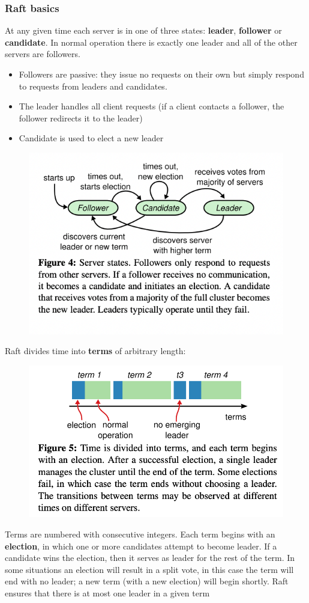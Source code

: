 \documentclass[11pt]{article}
\begin{document}
\subsubsection{Raft basics}
\label{sec:org8457912}
At any given time each server is in one of three states: \textbf{leader}, \textbf{follower} or \textbf{candidate}. In
normal operation there is exactly one leader and all of the other servers are followers.
\begin{itemize}
\item Followers are passive: they issue no requests on their own but simply respond to requests from
leaders and candidates.
\item The leader handles all client requests (if a client contacts a follower, the follower
redirects it to the leader)
\item Candidate is used to elect a new leader
\end{itemize}
\begin{figure}[htbp]
\centering
\includegraphics[width=.7\textwidth]{../images/6.824/4.png}
\label{}
\end{figure}

Raft divides time into \textbf{terms} of arbitrary length:
\begin{figure}[htbp]
\centering
\includegraphics[width=.7\textwidth]{../images/6.824/5.png}
\label{}
\end{figure}
Terms are numbered with consecutive integers. Each term begins with an \textbf{election}, in which one or
more candidates attempt to become leader. If a candidate wins the election, then it serves as
leader for the rest of the term. In some situations an election will result in a split vote, in
this case the term will end with no leader; a new term (with a new election) will begin shortly.
Raft ensures that there is at most one leader in a given term
\end{document}
